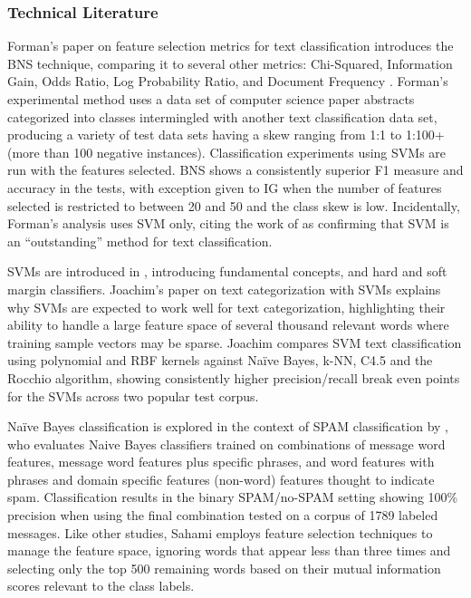 \documentclass[twoside,11pt]{article}
\begin{document}
\subsubsection{Technical Literature}
Forman's paper on feature selection metrics for text classification introduces the BNS technique, comparing it to several other metrics:  Chi-Squared, Information Gain, Odds Ratio,  Log Probability Ratio, and Document Frequency \citep{Forman}. Forman's experimental method uses a data set of computer science paper abstracts categorized into classes intermingled with another text classification data set, producing a variety of test data sets having a skew ranging from 1:1 to 1:100+ (more than 100 negative instances). Classification experiments using SVMs are run with the features selected. BNS shows a consistently superior F1 measure and accuracy in the tests, with exception given to IG when the number of features selected is restricted to between 20 and 50 and the class skew is low. Incidentally, Forman's analysis uses SVM only, citing the work of \citet{Joachims} as confirming that SVM is an ``outstanding'' method for text classification.
\par SVMs are introduced in \citep{Vapnik}, introducing fundamental concepts, and hard and soft margin classifiers. Joachim's paper on text categorization with SVMs \citep{Joachims} explains why SVMs are expected to work well for text categorization, highlighting their ability to handle a large feature space of several thousand relevant words where training sample vectors may be sparse. Joachim compares SVM text classification using polynomial and RBF kernels against Na\"ive Bayes, k-NN, C4.5 and the Rocchio algorithm, showing consistently higher precision/recall break even points for the SVMs across two popular test corpus.
\par Na\"ive Bayes classification is explored in the context of SPAM classification by \citet{Sahami}, who evaluates Naive Bayes classifiers trained on combinations of message word features, message word features plus specific phrases, and word features with phrases and domain specific features (non-word) features thought to indicate spam. Classification results in the binary SPAM/no-SPAM setting showing 100\% precision when using the final combination tested on a corpus of 1789 labeled messages. Like other studies, Sahami employs feature selection techniques to manage the feature space, ignoring words that appear less than three times and selecting only the top 500 remaining words based on their mutual information scores relevant to the class labels.
\end{document}
